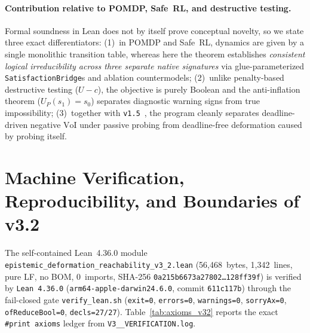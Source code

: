 \documentclass[10pt,a4paper]{article}
\theoremstyle{cleanthm}
\theoremstyle{cleandef}
\begin{document}
\paragraph{Contribution relative to POMDP, Safe~RL, and destructive testing.}
Formal soundness in Lean does not by itself prove conceptual novelty, so we state three exact differentiators: (1)~in POMDP and Safe~RL, dynamics are given by a single monolithic transition table, whereas here the theorem establishes \emph{consistent logical irreducibility across three separate native signatures} via glue-parameterized \texttt{Satisfaction\allowbreak Bridge}s and ablation countermodels; (2)~unlike penalty-based destructive testing ($U-c$), the objective is purely Boolean and the anti-inflation theorem ($U_P(s_1)=s_0$) separates diagnostic warning signs from true impossibility; (3)~together with \texttt{v1.5}~\cite{strand_v15}, the program cleanly separates deadline-driven negative $\mathrm{VoI}$ under passive probing from deadline-free deformation caused by probing itself.

\section{Machine Verification, Reproducibility, and Boundaries of v3.2}

The self-contained Lean~4.36.0 module \texttt{epistemic\_\allowbreak deformation\_\allowbreak reachability\_\allowbreak v3\_\allowbreak 2.lean} (56,468~bytes, 1,342~lines, pure LF, no BOM, 0~imports, SHA-256 \texttt{0a215b6673a27802\ldots{}128ff39f}) is verified by \texttt{Lean 4.36.0} (\texttt{arm64-apple-darwin24.6.0}, commit \texttt{611c117b}) through the fail-closed gate \texttt{verify\_\allowbreak lean.sh} (\texttt{exit=0}, \texttt{errors=0}, \texttt{warnings=0}, \texttt{sorryAx=0}, \texttt{ofReduceBool=0}, \texttt{decls=27/27}). Table~\ref{tab:axioms_v32} reports the exact \texttt{\#print axioms} ledger from \texttt{V3\_\_\allowbreak VERIFICATION.log}.
\end{document}
